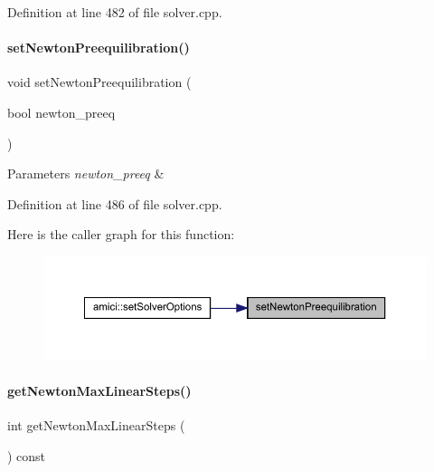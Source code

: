 Definition at line 482 of file solver.\+cpp.

\mbox{\label{classamici_1_1_solver_a8e71a26a59a4c3c03b362a72079377f2}} 
\paragraph{\texorpdfstring{setNewtonPreequilibration()}{setNewtonPreequilibration()}}
{\footnotesize\ttfamily void set\+Newton\+Preequilibration (\begin{DoxyParamCaption}\item[{bool}]{newton\+\_\+preeq }\end{DoxyParamCaption})}


\begin{DoxyParams}{Parameters}
{\em newton\+\_\+preeq} & \\
\hline
\end{DoxyParams}


Definition at line 486 of file solver.\+cpp.

Here is the caller graph for this function\+:
\nopagebreak
\begin{figure}[H]
\begin{center}
\leavevmode
\includegraphics[width=350pt]{classamici_1_1_solver_a8e71a26a59a4c3c03b362a72079377f2_icgraph}
\end{center}
\end{figure}
\mbox{\label{classamici_1_1_solver_a874c929a78d0e2af11c62ba958e1b3d1}} 
\paragraph{\texorpdfstring{getNewtonMaxLinearSteps()}{getNewtonMaxLinearSteps()}}
{\footnotesize\ttfamily int get\+Newton\+Max\+Linear\+Steps (\begin{DoxyParamCaption}{ }\end{DoxyParamCaption}) const}

